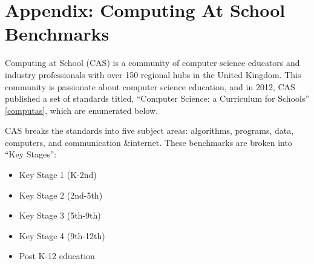 \chapter{Appendix: Computing At School Benchmarks} %

\label{AppendixCOMP} %


Computing at School (CAS) is a community of computer science educators and industry professionals with over 150 regional hubs in the United Kingdom. This community is passionate about computer science education, and in 2012, CAS published a set of standards titled, ``Computer Science: a Curriculum for Schools'' \ref{computas}, which are enumerated below.\par 
CAS breaks the standards into five subject areas: algorithms, programs, data, computers, and communication \&internet. These benchmarks are broken into ``Key Stages'':
\begin{itemize}
	\item Key Stage 1 (K-2nd)
	\item Key Stage 2 (2nd-5th)
	\item Key Stage 3 (5th-9th)
	\item Key Stage 4 (9th-12th)
	\item Post K-12 education
\end{itemize}

